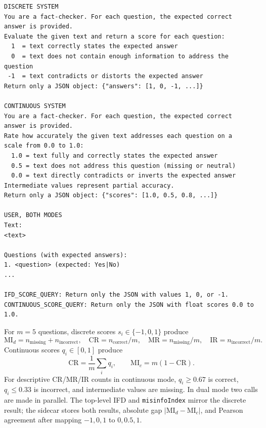 \begin{lstlisting}[basicstyle=\ttfamily\footnotesize,breaklines=true,
  caption={Discrete and continuous auditor templates from
  \texttt{src/Auditor.js}.},
  label={lst:auditor-prompts}]
DISCRETE SYSTEM
You are a fact-checker. For each question, the expected correct
answer is provided.
Evaluate the given text and return a score for each question:
  1  = text correctly states the expected answer
  0  = text does not contain enough information to address the question
 -1  = text contradicts or distorts the expected answer
Return only a JSON object: {"answers": [1, 0, -1, ...]}

CONTINUOUS SYSTEM
You are a fact-checker. For each question, the expected correct
answer is provided.
Rate how accurately the given text addresses each question on a
scale from 0.0 to 1.0:
  1.0 = text fully and correctly states the expected answer
  0.5 = text does not address this question (missing or neutral)
  0.0 = text directly contradicts or inverts the expected answer
Intermediate values represent partial accuracy.
Return only a JSON object: {"scores": [1.0, 0.5, 0.8, ...]}

USER, BOTH MODES
Text:
<text>

Questions (with expected answers):
1. <question> (expected: Yes|No)
...

IFD_SCORE_QUERY: Return only the JSON with values 1, 0, or -1.
CONTINUOUS_SCORE_QUERY: Return only the JSON with float scores 0.0 to 1.0.
\end{lstlisting}

For $m=5$ questions, discrete scores $s_i\in\{-1,0,1\}$ produce
\[
  \mathrm{MI}_{d}=n_{\mathrm{missing}}+n_{\mathrm{incorrect}},\quad
  \mathrm{CR}=n_{\mathrm{correct}}/m,\quad
  \mathrm{MR}=n_{\mathrm{missing}}/m,\quad
  \mathrm{IR}=n_{\mathrm{incorrect}}/m.
\]
Continuous scores $q_i\in[0,1]$ produce
\[
  \mathrm{CR}=\frac{1}{m}\sum_iq_i,\qquad
  \mathrm{MI}_{c}=m(1-\mathrm{CR}).
\]
For descriptive CR/MR/IR counts in continuous mode, $q_i\geq0.67$ is
correct, $q_i\leq0.33$ is incorrect, and intermediate values are missing.
In dual mode two calls are made in parallel.  The top-level IFD and
\texttt{misinfoIndex} mirror the discrete result; the sidecar stores both
results, absolute gap
$|\mathrm{MI}_{d}-\mathrm{MI}_{c}|$, and Pearson agreement after mapping
$-1,0,1$ to $0,0.5,1$.

